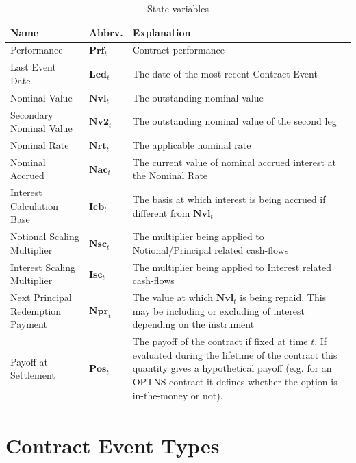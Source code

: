 \documentclass[9pt,oneside]{amsart}
\newcommand{\svar}[2]{\textbf{#1}_{#2}}
\begin{document}
\begin{multicols}{2}
\begin{table}[H]
	\centering
	\begin{tabular}{| p{0.8in}p{0.4in}p{1.6in} |}
	\hline
	\textbf{Name} & \textbf{Abbrv.} & \textbf{Explanation} \\
	\hline
	Performance & $\svar{Prf}{t}$ & Contract performance \\	
	\hline
	Last Event Date & $\svar{Led}{t}$ & The date of the most recent Contract Event \\
	\hline
	Nominal Value & $\svar{Nvl}{t}$ & The outstanding nominal value \\
	\hline
	Secondary Nominal Value & $\svar{Nv2}{t}$ & The outstanding nominal value of the second leg \\
	\hline
	Nominal Rate & $\svar{Nrt}{t}$ & The applicable nominal rate \\
	\hline
	Nominal Accrued & $\svar{Nac}{t}$ & The current value of nominal accrued interest at the Nominal Rate \\
	\hline
	Interest Calculation Base & $\svar{Icb}{t}$ & The basis at which interest is being accrued if different from $\svar{Nvl}{t}$ \\
	\hline
	Notional Scaling Multiplier & $\svar{Nsc}{t}$ & The multiplier being applied to Notional/Principal related
	cash-flows \\
	\hline
	Interest Scaling Multiplier & $\svar{Isc}{t}$ & The multiplier being applied to Interest related cash-flows \\
	\hline
	Next Principal Redemption Payment & $\svar{Npr}{t}$ & The value at which $\svar{Nvl}{t}$ is being repaid. This may be including or excluding of interest depending on the instrument\\
	\hline
	Payoff at Settlement & $\svar{Pos}{t}$ & The payoff of the contract if fixed at time $t$. If evaluated during the lifetime of the contract this quantity gives a hypothetical payoff (e.g. for an OPTNS contract it defines whether the option is in-the-money or not).\\
	\hline
	\end{tabular}
	\caption{State variables}
	\label{tbl:statevars}
\end{table}







\section{Contract Event Types}\label{sec:events}


\end{multicols}
\end{document}
